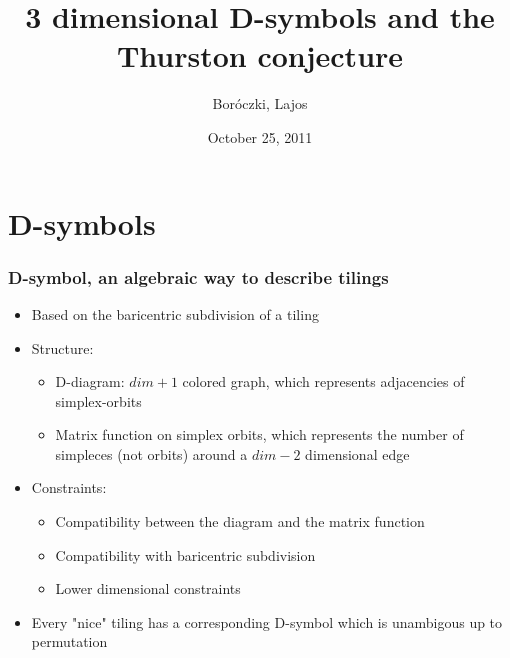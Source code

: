 \usepackage[utf8]{inputenc}
\usepackage{graphicx}
\usepackage{listings}
\usepackage{amsmath}
\usepackage{amssymb}
\usepackage{ae,aecompl}

\beamertemplatenavigationsymbolsempty

\newcommand{\leftexp}[2]{{\vphantom{#2}}^{#1}{#2}}

\title{3 dimensional D-symbols and the Thurston conjecture}
\author{Boróczki, Lajos}
\date{October 25, 2011}



\begin{frame}
  \maketitle
\end{frame}

\begin{frame}
  \tableofcontents
\end{frame}
\newpage

\section{D-symbols}
\begin{frame}
  \frametitle{D-symbol, an algebraic way to describe tilings}
  \begin{itemize}
    \item Based on the baricentric subdivision of a tiling
    \item Structure:
      \begin{itemize}
	\item D-diagram: $dim+1$ colored graph, which represents adjacencies of
	  simplex-orbits
	\item Matrix function on simplex orbits, which represents the number of
	  simpleces (not orbits) around a $dim-2$ dimensional edge
      \end{itemize}
    \item Constraints:
      \begin{itemize}
	\item Compatibility between the diagram and the matrix function
	\item Compatibility with baricentric subdivision
	\item Lower dimensional constraints
      \end{itemize}
    \item Every "nice" tiling has a corresponding D-symbol which is unambigous
      up to permutation 
  \end{itemize}
\end{frame}

